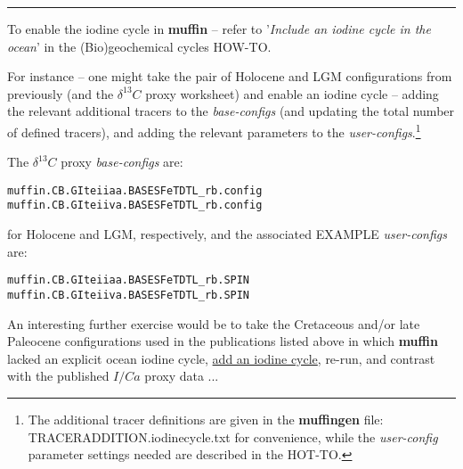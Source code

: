 \documentclass[11pt,fleqn]{book} %
\begin{document}
\vspace{1mm}
\noindent\rule{4cm}{0.5pt}
\vspace{2mm}

\noindent To enable the iodine cycle in \textbf{muffin} -- refer to '\textit{Include an iodine cycle in the ocean}' in the (Bio)geochemical cycles HOW-TO.

For instance -- one might take the pair of Holocene and LGM configurations from previously (and the \(\delta^{13}C\) proxy worksheet) and enable an iodine cycle -- adding the relevant additional tracers to the \textit{base-configs} (and updating the total number of defined tracers), and adding the relevant parameters to the \textit{user-configs}.\footnote{The additional tracer definitions are given in the \textbf{muffingen} file: \textsf{\footnotesize TRACERADDITION.iodinecycle.txt} for convenience, while the \textit{user-config} parameter settings needed are described in the HOT-TO.}

The \(\delta^{13}C\) proxy \textit{base-configs} are:
\vspace{-1mm}\small\begin{verbatim}
muffin.CB.GIteiiaa.BASESFeTDTL_rb.config
muffin.CB.GIteiiva.BASESFeTDTL_rb.config
\end{verbatim}\normalsize\vspace{-1mm}
for Holocene and LGM, respectively, and the associated EXAMPLE \textit{user-configs} are:
\vspace{-1mm}\small\begin{verbatim}
muffin.CB.GIteiiaa.BASESFeTDTL_rb.SPIN
muffin.CB.GIteiiva.BASESFeTDTL_rb.SPIN
\end{verbatim}\normalsize\vspace{-1mm}


\newpage 

\noindent An interesting further exercise would be to take the Cretaceous and/or late Paleocene configurations used in the publications listed above in which \textbf{muffin} lacked an explicit ocean iodine cycle, \uline{add an iodine cycle}, re-run, and contrast with the published \(I/Ca\) proxy data ...


\newpage

\end{document}
